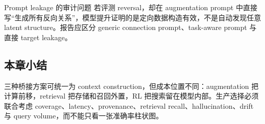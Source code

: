 \begin{warningbox}{Prompt leakage 的审计问题}
若评测 reversal，却在 augmentation prompt 中直接写“生成所有反向关系”，模型提升证明的是定向数据构造有效，不是自动发现任意 latent structure。报告应区分 generic connection prompt、task-aware prompt 与直接 target leakage。
\end{warningbox}

\subsection{本章小结}

三种桥接方案可统一为 context construction，但成本位置不同：augmentation 把计算前移，retrieval 把存储和召回外置，RL 把搜索留在模型内部。生产选择必须联合考虑 coverage、latency、provenance、retrieval recall、hallucination、drift 与 query volume，而不能只看一张准确率柱状图。

